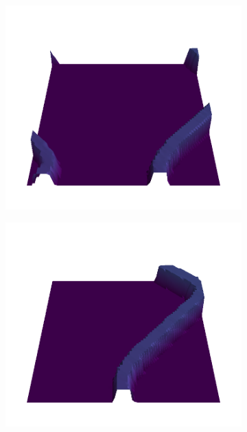\documentclass[../document.tex]{subfiles}
\begin{document}
\begin{figure}[H]
    \begin{subfigure}[b]{0.19\textwidth}
    \includegraphics[width=\linewidth]{../img/bars1-example-patches/3d-viridis/4.png}    \end{subfigure}
    \begin{subfigure}[b]{0.19\textwidth}
    \includegraphics[width=\linewidth]{../img/bars1-example-patches/3d-viridis/7.png}    \end{subfigure}  
    \begin{subfigure}[b]{0.19\textwidth}

\end{subfigure}
\end{figure}
\end{document}
